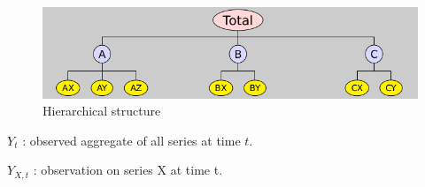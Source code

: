 \documentclass[c, dvipsnames]{beamer}  %
\begin{document}
\begin{frame}[shrink=5]
\frametitle{\insertsection} 
\framesubtitle{\insertsubsection}

\begin{figure}
\centering
\includegraphics[width=0.7\linewidth]{screenshot010}
\caption{Hierarchical structure}
\label{fig:screenshot010}
\end{figure}


$ Y_t $ : observed aggregate of all
series at time $ t $.

$ Y_{ X , t} $ : observation on series X at
time t.

\end{frame}
\end{document}
